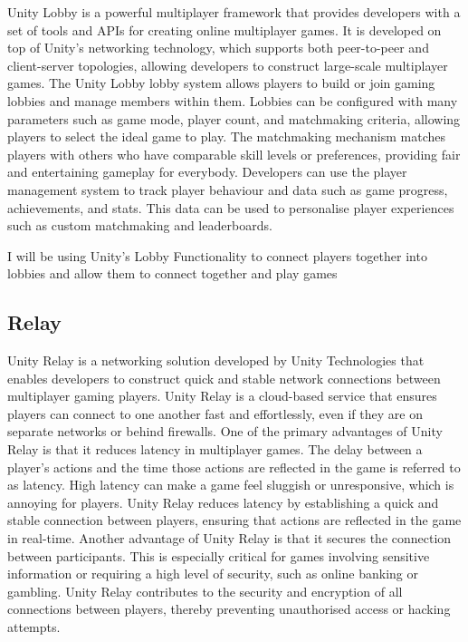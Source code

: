 Unity Lobby is a powerful multiplayer framework that provides developers with a set of tools and APIs for creating online multiplayer games. It is developed on top of Unity's networking technology, which supports both peer-to-peer and client-server topologies, allowing developers to construct large-scale multiplayer games.
The Unity Lobby lobby system allows players to build or join gaming lobbies and manage members within them. Lobbies can be configured with many parameters such as game mode, player count, and matchmaking criteria, allowing players to select the ideal game to play. The matchmaking mechanism matches players with others who have comparable skill levels or preferences, providing fair and entertaining gameplay for everybody.
Developers can use the player management system to track player behaviour and data such as game progress, achievements, and stats. This data can be used to personalise player experiences such as custom matchmaking and leaderboards.

I will be using Unity's Lobby Functionality to connect players together into lobbies and allow them to connect together and play games

\subsection{Relay}

Unity Relay is a networking solution developed by Unity Technologies that enables developers to construct quick and stable network connections between multiplayer gaming players. Unity Relay is a cloud-based service that ensures players can connect to one another fast and effortlessly, even if they are on separate networks or behind firewalls.
One of the primary advantages of Unity Relay is that it reduces latency in multiplayer games. The delay between a player's actions and the time those actions are reflected in the game is referred to as latency. High latency can make a game feel sluggish or unresponsive, which is annoying for players. Unity Relay reduces latency by establishing a quick and stable connection between players, ensuring that actions are reflected in the game in real-time.
Another advantage of Unity Relay is that it secures the connection between participants. This is especially critical for games involving sensitive information or requiring a high level of security, such as online banking or gambling. Unity Relay contributes to the security and encryption of all connections between players, thereby preventing unauthorised access or hacking attempts.

